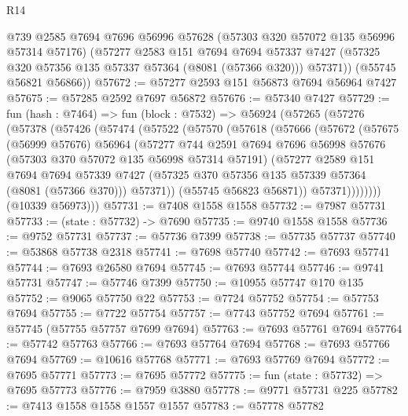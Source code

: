 \begin{lexlean}{R14}
\begin{coremodule}
        @739
        @2585
        @7694
        @7696
        @56996
        @57628
        (@57303 @320 @57072 @135 @56996 @57314 @57176)
        (@57277
          @2583
          @151
          @7694
          @7694
          @57337
          @7427
          (@57325 @320 @57356 @135 @57337 @57364 (@8081 (@57366 @320)))
          @57371))
      (@55745 @56821 @56866))
@57672 := @57277 @2593 @151 @56873 @7694 @56964 @7427
@57675 := @57285 @2592 @7697 @56872
@57676 := @57340 @7427
@57729 := fun (hash : @7464) =>
  fun (block : @7532) =>
  @56924
    (@57265
      (@57276
        (@57378
          (@57426
            (@57474
              (@57522
                (@57570
                  (@57618
                    (@57666
                      (@57672
                        (@57675
                          (@56999 @57676)
                          @56964
                          (@57277
                            @744
                            @2591
                            @7694
                            @7696
                            @56998
                            @57676
                            (@57303 @370 @57072 @135 @56998 @57314 @57191)
                            (@57277
                              @2589
                              @151
                              @7694
                              @7694
                              @57339
                              @7427
                              (@57325 @370 @57356 @135 @57339 @57364 (@8081 (@57366 @370)))
                              @57371))
                          (@55745 @56823 @56871))
                        @57371))))))))
        (@10339 @56973)))
@57731 := @7408 @1558 @1558
@57732 := @7987 @57731
@57733 := (state : @57732) -> @7690
@57735 := @9740 @1558 @1558
@57736 := @9752 @57731
@57737 := @57736 @7399
@57738 := @57735 @57737
@57740 := @53868 @57738 @2318
@57741 := @7698 @57740
@57742 := @7693 @57741
@57744 := @7693 @26580 @7694
@57745 := @7693 @57744
@57746 := @9741 @57731
@57747 := @57746 @7399
@57750 := @10955 @57747 @170 @135
@57752 := @9065 @57750 @22
@57753 := @7724 @57752
@57754 := @57753 @7694
@57755 := @7722 @57754
@57757 := @7743 @57752 @7694
@57761 := @57745 (@57755 @57757 @7699 @7694)
@57763 := @7693 @57761 @7694
@57764 := @57742 @57763
@57766 := @7693 @57764 @7694
@57768 := @7693 @57766 @7694
@57769 := @10616 @57768
@57771 := @7693 @57769 @7694
@57772 := @7695 @57771
@57773 := @7695 @57772
@57775 := fun (state : @57732) => @7695 @57773
@57776 := @7959 @3880
@57778 := @9771 @57731 @225
@57782 := @7413 @1558 @1558 @1557 @1557
@57783 := @57778 @57782

\end{coremodule}
\end{lexlean}
